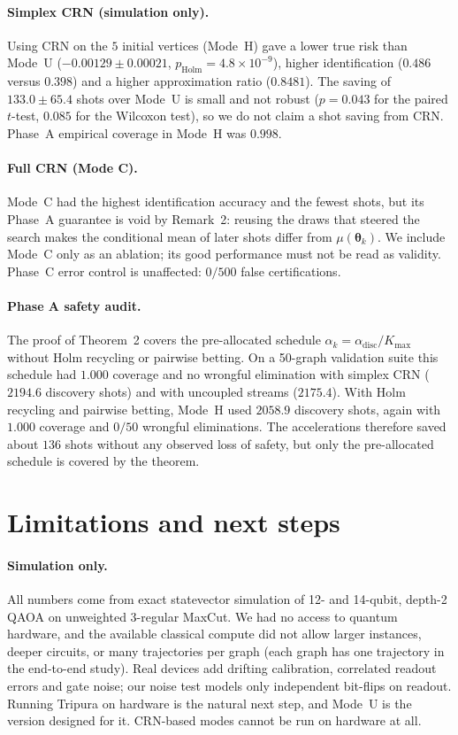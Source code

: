 \documentclass[a4paper,onecolumn,unpublished]{quantumarticle}
\newcommand{\adisc}{\alpha_{\mathrm{disc}}}
\newcommand{\Kmax}{K_{\max}}
\renewcommand{\th}{\bm{\theta}}
\begin{document}
\paragraph*{Simplex CRN (simulation only).}
Using CRN on the $5$ initial vertices (Mode~H) gave a lower true risk than Mode~U ($-0.00129 \pm 0.00021$, $p_{\mathrm{Holm}} = 4.8 \times 10^{-9}$), higher identification ($0.486$ versus $0.398$) and a higher approximation ratio ($0.8481$). The saving of $133.0 \pm 65.4$ shots over Mode~U is small and not robust ($p = 0.043$ for the paired $t$-test, $0.085$ for the Wilcoxon test), so we do not claim a shot saving from CRN. Phase~A empirical coverage in Mode~H was $0.998$.

\paragraph*{Full CRN (Mode C).}
Mode~C had the highest identification accuracy and the fewest shots, but its Phase~A guarantee is void by Remark~2: reusing the draws that steered the search makes the conditional mean of later shots differ from $\mu(\th_k)$. We include Mode~C only as an ablation; its good performance must not be read as validity. Phase~C error control is unaffected: $0/500$ false certifications.

\paragraph*{Phase A safety audit.}
The proof of Theorem~2 covers the pre-allocated schedule $\alpha_k = \adisc / \Kmax$ without Holm recycling or pairwise betting. On a 50-graph validation suite this schedule had $1.000$ coverage and no wrongful elimination with simplex CRN ($2194.6$ discovery shots) and with uncoupled streams ($2175.4$). With Holm recycling and pairwise betting, Mode~H used $2058.9$ discovery shots, again with $1.000$ coverage and $0/50$ wrongful eliminations. The accelerations therefore saved about $136$ shots without any observed loss of safety, but only the pre-allocated schedule is covered by the theorem.

\section{Limitations and next steps}
\label{sec:limitations}

\paragraph*{Simulation only.}
All numbers come from exact statevector simulation of 12- and 14-qubit, depth-2 QAOA on unweighted 3-regular MaxCut. We had no access to quantum hardware, and the available classical compute did not allow larger instances, deeper circuits, or many trajectories per graph (each graph has one trajectory in the end-to-end study). Real devices add drifting calibration, correlated readout errors and gate noise; our noise test models only independent bit-flips on readout. Running Tripura on hardware is the natural next step, and Mode~U is the version designed for it. CRN-based modes cannot be run on hardware at all.
\end{document}
